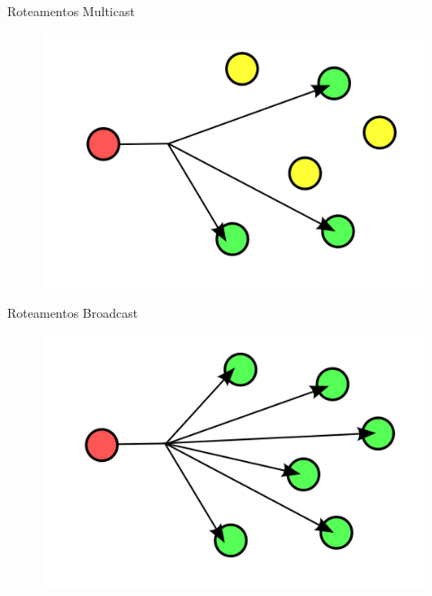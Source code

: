 \documentclass[t]{beamer}
\begin{document}
\begin{frame}{Roteamentos}
Multicast
\begin{figure}
	\includegraphics[width=\linewidth]{Multicast}
\end{figure}
\end{frame}

\begin{frame}{Roteamentos}
Broadcast
\begin{figure}
	\includegraphics[width=\linewidth]{Broadcast}
\end{figure}
\end{frame}
\end{document}
